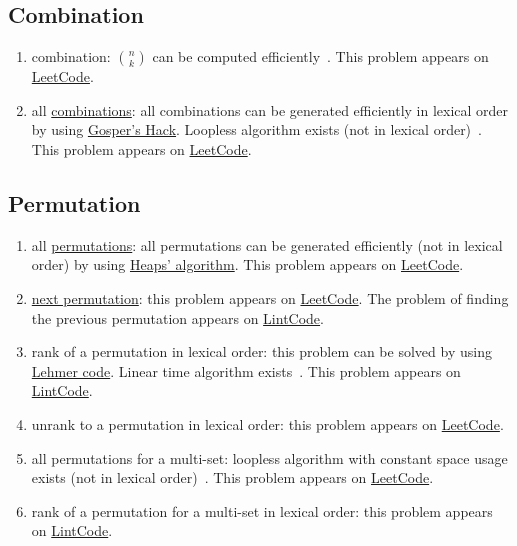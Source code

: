 \subsection{Combination}
\begin{enumerate}
\item combination: $n\choose{k}$ can be computed efficiently~\cite{Manolopoulos02}. This problem appears on \href{https://leetcode.com/problems/unique-paths/}{LeetCode}.
\item all \href{https://en.wikipedia.org/wiki/Combination}{combinations}: all combinations can be generated efficiently in lexical order by using \href{https://en.wikipedia.org/wiki/Combinatorial_number_system#Applications}{Gosper's Hack}. Loopless algorithm exists (not in lexical order)~\cite{Ruskey2009}. This problem appears on \href{https://leetcode.com/problems/combinations/}{LeetCode}.
\end{enumerate}

\subsection{Permutation}
\begin{enumerate}
\item all \href{https://en.wikipedia.org/wiki/Permutation}{permutations}: all permutations can be generated efficiently (not in lexical order) by using \href{https://en.wikipedia.org/wiki/Heap\%27s_algorithm}{Heaps' algorithm}. This problem appears on \href{https://leetcode.com/problems/permutations/}{LeetCode}.
\item \href{https://en.wikipedia.org/wiki/Permutation#Generation_in_lexicographic_order}{next permutation}: this problem appears on \href{https://leetcode.com/problems/next-permutation/}{LeetCode}. The problem of finding the previous permutation appears on \href{http://www.lintcode.com/en/problem/previous-permutation/}{LintCode}.
\item rank of a permutation in lexical order: this problem can be solved by using \href{https://en.wikipedia.org/wiki/Lehmer_code#Encoding_and_decoding}{Lehmer code}. Linear time algorithm exists~\cite{Mares2007}. This problem appears on \href{http://www.lintcode.com/en/problem/permutation-index/}{LintCode}. 
\item unrank to a permutation in lexical order: this problem appears on \href{https://leetcode.com/problems/permutation-sequence/}{LeetCode}.
\item all permutations for a multi-set: loopless algorithm with constant space usage exists (not in lexical order)~\cite{AWilliams2009}. This problem appears on \href{https://leetcode.com/problems/permutations-ii/}{LeetCode}.
\item rank of a permutation for a multi-set in lexical order: this problem appears on \href{http://www.lintcode.com/en/problem/permutation-index-ii/}{LintCode}.
\end{enumerate}

